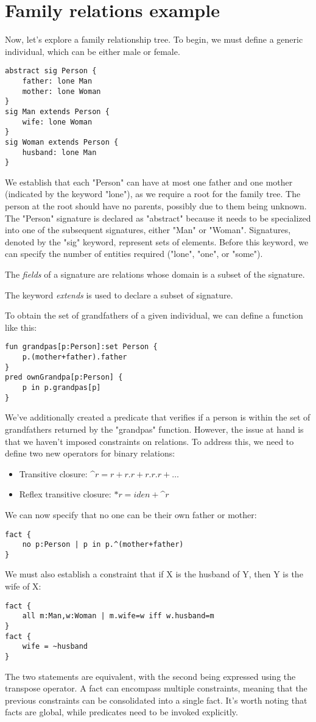 \section{Family relations example}

Now, let's explore a family relationship tree. 
To begin, we must define a generic individual, which can be either male or female.        
\begin{lstlisting}[language=alloy]
abstract sig Person {
    father: lone Man
    mother: lone Woman
}
sig Man extends Person {
    wife: lone Woman
}
sig Woman extends Person {
    husband: lone Man
}
\end{lstlisting}
We establish that each "Person" can have at most one father and one mother (indicated by the keyword "lone"), as we require a root for the family tree. 
The person at the root should have no parents, possibly due to them being unknown. 
The "Person" signature is declared as "abstract" because it needs to be specialized into one of the subsequent signatures, either "Man" or "Woman". 
Signatures, denoted by the "sig" keyword, represent sets of elements. 
Before this keyword, we can specify the number of entities required ("lone", "one", or "some").
\begin{definition}
    The \emph{fields} of a signature are relations whose domain is a subset of the signature. 
    
    The keyword \emph{extends} is used to declare a subset of signature. 
\end{definition}
To obtain the set of grandfathers of a given individual, we can define a function like this:
\begin{lstlisting}[language=alloy]
fun grandpas[p:Person]:set Person {
    p.(mother+father).father
}
pred ownGrandpa[p:Person] {
    p in p.grandpas[p]
}
\end{lstlisting}
We've additionally created a predicate that verifies if a person is within the set of grandfathers returned by the "grandpas" function. 
However, the issue at hand is that we haven't imposed constraints on relations. 
To address this, we need to define two new operators for binary relations:
\begin{itemize}
    \item Transitive closure: \textasciicircum $r=r+r.r+r.r.r+\dots$
    \item Reflex transitive closure: $*r=iden+$\textasciicircum$r$
\end{itemize}
We can now specify that no one can be their own father or mother:
\begin{lstlisting}[language=alloy]
fact {
    no p:Person | p in p.^(mother+father)
}
\end{lstlisting}
We must also establish a constraint that if X is the husband of Y, then Y is the wife of X:
\begin{lstlisting}[language=alloy]
fact {
    all m:Man,w:Woman | m.wife=w iff w.husband=m
}
fact {
    wife = ~husband
}
\end{lstlisting}
The two statements are equivalent, with the second being expressed using the transpose operator.
A fact can encompass multiple constraints, meaning that the previous constraints can be consolidated into a single fact.
It's worth noting that facts are global, while predicates need to be invoked explicitly.